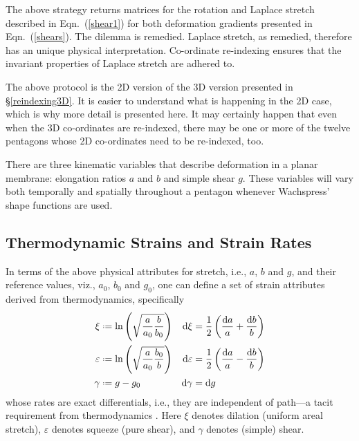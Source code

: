 The above strategy returns matrices for the rotation and Laplace stretch described in Eqn.~(\ref{shear1}) for both deformation gradients presented in Eqn.~(\ref{shears}). The dilemma is remedied.  Laplace stretch, as remedied, therefore has an unique physical interpretation.    Co-ordinate re-indexing ensures that the invariant properties of Laplace stretch \cite{McLellan80} are adhered to.

The above protocol is the 2D version of the 3D version presented in \S\ref{reindexing3D}.  It is easier to understand what is happening in the 2D case, which is why more detail is presented here.  It may certainly happen that even when the 3D co-ordinates are re-indexed, there may be one or more of the twelve pentagons whose 2D co-ordinates need to be re-indexed, too.

There are three kinematic variables that describe deformation in a planar membrane: elongation ratios $a$ and $b$ and simple shear $g$.  These variables will vary both temporally and spatially throughout a pentagon whenever Wachspress' shape functions are used.

\subsection{Thermodynamic Strains and Strain Rates}
\label{strainsAndStrainRates2D}

In terms of the above physical attributes for stretch, i.e., $a$, $b$ and $g$, and their reference values, viz., $a_0$, $b_0$ and $g_0$, one can define a set of strain attributes derived from thermo\-dynamics, specifically \cite{Freed17}
\begin{subequations}
    \label{thermodynamicStrains2D}
    \begin{align}
    \xi & \defeq \ln \left( \sqrt{\frac{a}{a_0} \frac{b}{b_0}} \right) & 
    \mathrm{d} \xi & = \frac{1}{2} \left( \frac{\mathrm{d}a}{a} + 
    \frac{\mathrm{d}b}{b} \right) \\
    \varepsilon & \defeq \ln \left( \sqrt{\frac{a}{a_0} \frac{b_0}{b}} \right) &
    \mathrm{d} \varepsilon & = \frac{1}{2} \left( \frac{\mathrm{d}a}{a} - 
    \frac{\mathrm{d}b}{b} \right) \\
    \gamma & \defeq g - g_0 & 
    \mathrm{d} \gamma & = \mathrm{d} g
    \end{align}
\end{subequations}
whose rates are exact differentials, i.e., they are independent of path---a tacit requirement from thermo\-dynamics \cite{Caratheodory09}.  Here $\xi$ denotes dilation (uniform areal stretch), $\varepsilon$ denotes squeeze (pure shear), and $\gamma$ denotes (simple) shear. 

